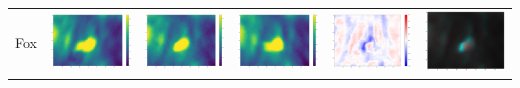 \documentclass[landscape,paperwidth=46truein,paperheight=41truein,fontscale=0.3]{baposter}
\begin{document}
\begin{poster}
{\begin{center}
\begin{minipage}{0.97 \columnwidth}
\begin{multicols}{2}
				
				{
				\setlength{\tabcolsep}{.05em} %
				\renewcommand{\arraystretch}{0.5}%
				\begin{tabular}{c c c c c c }
					
%					
					
					
					Fox &
					\includegraphics[width=0.185\linewidth]{../../../../src/python/minnd/movies/fox/intensity/minus/fig_14} &
					\includegraphics[width=0.185\linewidth]{../../../../src/python/minnd/movies/fox/intensity/zero/fig_14} &
					\includegraphics[width=0.185\linewidth]{../../../../src/python/minnd/movies/fox/intensity/plus/fig_14} &
					\includegraphics[width=0.185\linewidth]{../../../../src/python/minnd/movies/fox/velocity/zero-ave/fig_14} &
					\includegraphics[width=0.185\linewidth]{../../../../src/python/minnd/movies/fox/intensity-velocity/zero-ave/fig_14} \\
					

\end{tabular}}
\end{multicols}
\end{minipage}
\end{center}}
\end{poster}
\end{document}
